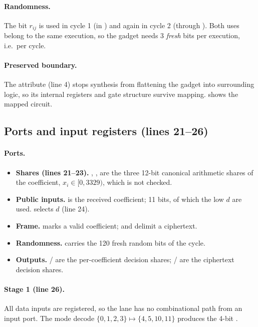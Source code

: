 \paragraph{Randomness.} The bit $r_{ij}$ is used in cycle 1 (in ) and again in cycle 2 (through ). Both uses belong to the same execution, so the gadget needs 3 \emph{fresh} bits per execution, i.e.\ per cycle.

\paragraph{Preserved boundary.} The attribute  (line 4) stops synthesis from flattening the gadget into surrounding logic, so its internal registers and gate structure survive mapping.  shows the mapped circuit.

\subsection{Ports and input registers (lines 21--26)}\label{app:v-ports}

\paragraph{Ports.}
\begin{itemize}
  \item \textbf{Shares (lines 21--23).} , ,  are the three 12-bit canonical arithmetic shares of the coefficient, $x_i \in [0, 3329)$, which is not checked.
  \item \textbf{Public inputs.}  is the received coefficient; 11 bits, of which the low $d$ are used.  selects $d$ (line 24).
  \item \textbf{Frame.}  marks a valid coefficient;  and  delimit a ciphertext.
  \item \textbf{Randomness.}  carries the 120 fresh random bits of the cycle.
  \item \textbf{Outputs.} / are the per-coefficient decision shares; / are the ciphertext decision shares.
\end{itemize}

\paragraph{Stage 1 (line 26).} All data inputs are registered, so the lane has no combinational path from an input port. The mode decode $\{0, 1, 2, 3\} \mapsto \{4, 5, 10, 11\}$ produces the 4-bit .

